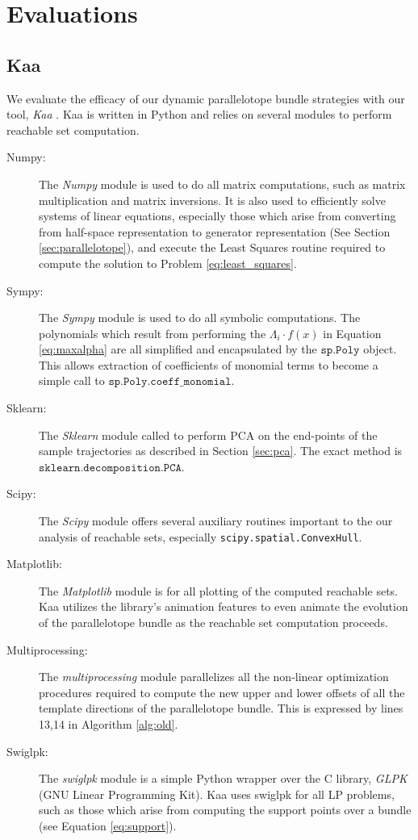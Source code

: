 \chapter{Evaluations}
\section{Kaa}
\label{sec:kaa}
%
We evaluate the efficacy of our dynamic parallelotope bundle strategies with our tool, \emph{Kaa} .
%
Kaa is written in Python and relies on several modules to perform reachable set computation.
\begin{description}
  \item[Numpy:] The \emph{Numpy} module is used to do all matrix computations, such as matrix multiplication and matrix inversions. It is also used to efficiently solve systems of linear equations, especially those which arise from converting from half-space representation to generator representation (See Section \ref{sec:parallelotope}), and execute the Least Squares routine required to compute the solution to Problem \ref{eq:least_squares}.
  \item[Sympy:] The \emph{Sympy} module is used to do all symbolic computations. The polynomials which result from performing the $\Lambda_i \cdot f(x)$ in Equation \ref{eq:maxalpha} are all simplified and encapsulated by the $\texttt{sp.Poly}$ object. This allows extraction of coefficients of monomial terms to become a simple call to
  $\texttt{sp.Poly.coeff\_monomial}$.
  \item[Sklearn:] The \emph{Sklearn} module called to perform PCA on the end-points of the sample trajectories as described in Section \ref{sec:pca}. The exact method is $\texttt{sklearn.decomposition.PCA}$.
  \item[Scipy:] The \emph{Scipy} module offers several auxiliary routines important to the our analysis of reachable sets, especially \texttt{scipy.spatial.ConvexHull}.
  \item[Matplotlib:] The \emph{Matplotlib} module is for all plotting of the computed reachable sets. Kaa utilizes the library's animation features to even animate the evolution of the parallelotope bundle as the reachable set computation proceeds.
  \item[Multiprocessing:] The \emph{multiprocessing} module parallelizes all the non-linear optimization procedures required to compute the new upper and lower offsets of all the template directions of the parallelotope bundle. This is expressed by lines 13,14 in Algorithm \ref{alg:old}.
  \item[Swiglpk:] The \emph{swiglpk} module is a simple Python wrapper over the C library, \emph{GLPK} (GNU Linear Programming Kit). Kaa uses swiglpk for all LP problems, such as those which arise from computing the support points over a bundle (see Equation \ref{eq:support}).
\end{description}

